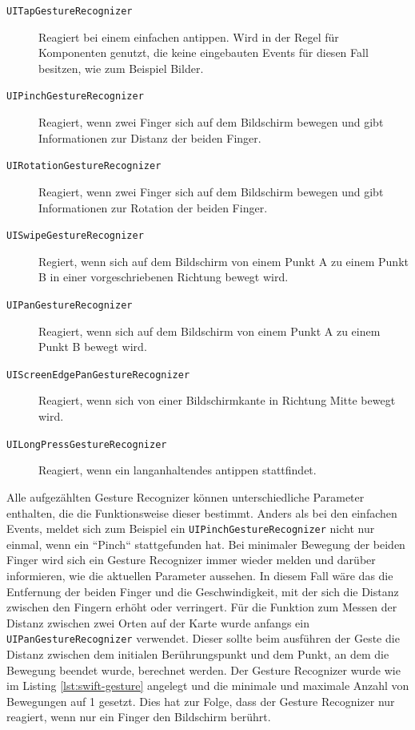 \begin{description}
	\item[\texttt{UITapGestureRecognizer}] Reagiert bei einem einfachen antippen. Wird in der Regel für Komponenten genutzt, die keine eingebauten Events für diesen Fall besitzen, wie zum Beispiel Bilder.
	\item[\texttt{UIPinchGestureRecognizer}] Reagiert, wenn zwei Finger sich auf dem Bildschirm bewegen und gibt Informationen zur Distanz der beiden Finger.
	\item[\texttt{UIRotationGestureRecognizer}] Reagiert, wenn zwei Finger sich auf dem Bildschirm bewegen und gibt Informationen zur Rotation der beiden Finger.
	\item[\texttt{UISwipeGestureRecognizer}] Regiert, wenn sich auf dem Bildschirm von einem Punkt A zu einem Punkt B in einer vorgeschriebenen Richtung bewegt wird.
	\item[\texttt{UIPanGestureRecognizer}] Reagiert, wenn sich auf dem Bildschirm von einem Punkt A zu einem Punkt B bewegt wird.
	\item[\texttt{UIScreenEdgePanGestureRecognizer}] Reagiert, wenn sich von einer Bildschirmkante in Richtung Mitte bewegt wird.
	\item[\texttt{UILongPressGestureRecognizer}] Reagiert, wenn ein langanhaltendes antippen stattfindet.
\end{description}
Alle aufgezählten Gesture Recognizer können unterschiedliche Parameter enthalten, die die Funktionsweise dieser bestimmt.
Anders als bei den einfachen Events, meldet sich zum Beispiel ein \texttt{UIPinchGestureRecognizer} nicht nur einmal, wenn ein ``Pinch`` stattgefunden hat.
Bei minimaler Bewegung der beiden Finger wird sich ein Gesture Recognizer immer wieder melden und darüber informieren, wie die aktuellen Parameter aussehen.
In diesem Fall wäre das die Entfernung der beiden Finger und die Geschwindigkeit, mit der sich die Distanz zwischen den Fingern erhöht oder verringert.\pbreak%
%
Für die Funktion zum Messen der Distanz zwischen zwei Orten auf der Karte wurde anfangs ein \texttt{UIPanGestureRecognizer} verwendet.
Dieser sollte beim ausführen der Geste die Distanz zwischen dem initialen Berührungspunkt und dem Punkt, an dem die Bewegung beendet wurde, berechnet werden.
Der Gesture Recognizer wurde wie im Listing \ref{lst:swift-gesture} angelegt und die minimale und maximale Anzahl von Bewegungen auf 1 gesetzt.
Dies hat zur Folge, dass der Gesture Recognizer nur reagiert, wenn nur ein Finger den Bildschirm berührt.
